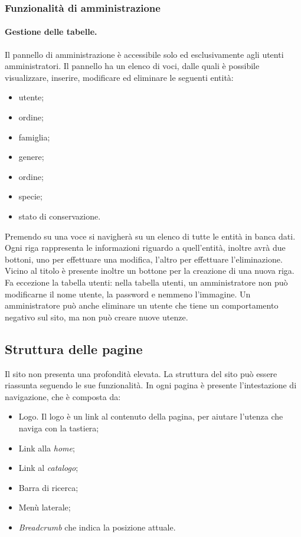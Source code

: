 \documentclass[12pt, a4paper]{article}
\begin{document}
    \subsubsection{Funzionalità di amministrazione}

    \paragraph{Gestione delle tabelle.}
    Il pannello di amministrazione è accessibile solo ed esclusivamente agli utenti amministratori. Il pannello ha un elenco di voci, dalle quali è possibile visualizzare, inserire, modificare ed eliminare le seguenti entità:
    \begin{itemize}
        \item utente;
        \item ordine;
        \item famiglia;
        \item genere;
        \item ordine;
        \item specie;
        \item stato di conservazione.
    \end{itemize}
    Premendo su una voce si navigherà su un elenco di tutte le entità in banca dati. Ogni riga rappresenta le informazioni riguardo a quell'entità, inoltre avrà due bottoni, uno per effettuare una modifica, l'altro per effettuare l'eliminazione. Vicino al titolo è presente inoltre un bottone per la creazione di una nuova riga. Fa eccezione la tabella utenti: nella tabella utenti, un amministratore non può modificarne il nome utente, la password e nemmeno l'immagine. Un amministratore può anche eliminare un utente che tiene un comportamento negativo sul sito, ma non può creare nuove utenze.



    \subsection{Struttura delle pagine}
    Il sito non presenta una profondità elevata. La struttura del sito può essere riassunta seguendo le sue funzionalità. In ogni pagina è presente l'intestazione di navigazione, che è composta da:
    \begin{itemize}
        \item Logo. Il logo è un link al contenuto della pagina, per aiutare l'utenza che naviga con la tastiera;
        \item Link alla \textit{home};
        \item Link al \textit{catalogo};
        \item Barra di ricerca;
        \item Menù laterale;
        \item \textit{Breadcrumb} che indica la posizione attuale.
    \end{itemize}
\end{document}
